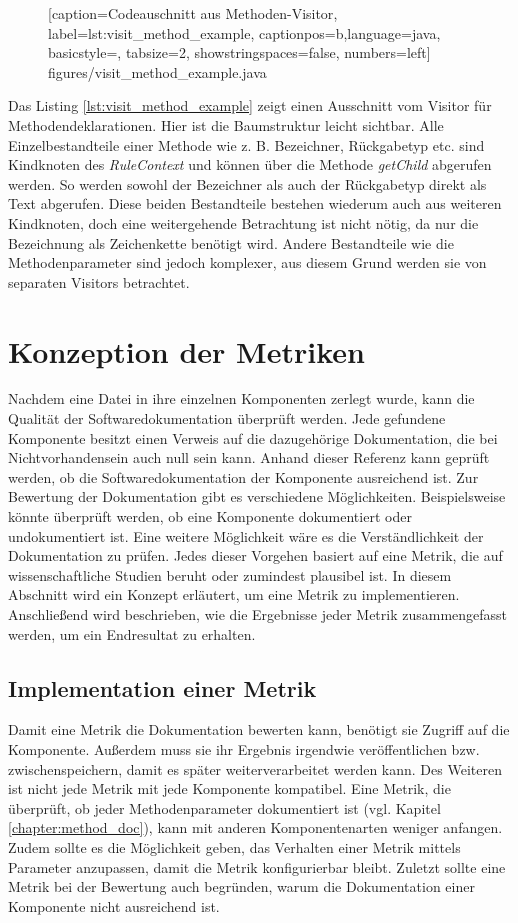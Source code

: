 		\begin{figure} [htbp]
			
			[caption={Codeauschnitt aus  Methoden-Visitor},
			label={lst:visit_method_example},
			captionpos=b,language=java, basicstyle=\footnotesize, tabsize=2, showstringspaces=false,  numbers=left]
			{figures/visit_method_example.java}
		\end{figure}
Das Listing \ref{lst:visit_method_example} zeigt einen Ausschnitt vom Visitor für Methodendeklarationen. Hier ist die Baumstruktur leicht sichtbar. Alle Einzelbestandteile einer Methode wie z. B. Bezeichner, Rückgabetyp etc. sind Kindknoten des \textit{RuleContext} und können über die Methode \textit{getChild} abgerufen werden. So werden sowohl der Bezeichner als auch der Rückgabetyp direkt als Text abgerufen. Diese  beiden Bestandteile bestehen wiederum auch aus weiteren Kindknoten, doch eine weitergehende Betrachtung ist nicht nötig, da nur die Bezeichnung als Zeichenkette benötigt wird. Andere Bestandteile wie die Methodenparameter sind jedoch komplexer, aus diesem Grund werden sie von separaten Visitors betrachtet.

\section{Konzeption der Metriken}
Nachdem eine Datei in ihre einzelnen Komponenten zerlegt wurde, kann die Qualität der Softwaredokumentation überprüft werden. Jede gefundene Komponente besitzt einen Verweis auf die dazugehörige Dokumentation, die bei Nichtvorhandensein auch null sein kann. Anhand dieser Referenz kann geprüft werden, ob die Softwaredokumentation der Komponente ausreichend ist. Zur Bewertung der Dokumentation gibt es verschiedene  Möglichkeiten. Beispielsweise könnte überprüft werden, ob eine Komponente dokumentiert oder undokumentiert ist. Eine weitere Möglichkeit wäre es die Verständlichkeit der Dokumentation zu prüfen. Jedes dieser Vorgehen basiert auf eine Metrik, die auf wissenschaftliche Studien beruht oder zumindest plausibel ist. In diesem Abschnitt wird ein Konzept erläutert, um eine Metrik zu implementieren. Anschließend wird beschrieben, wie die Ergebnisse jeder Metrik zusammengefasst werden, um ein Endresultat zu erhalten. 

\subsection{Implementation einer Metrik}
Damit eine Metrik die Dokumentation bewerten kann, benötigt sie Zugriff auf die Komponente. Außerdem muss sie ihr Ergebnis irgendwie veröffentlichen bzw. zwischenspeichern, damit es später weiterverarbeitet werden kann. Des Weiteren ist nicht jede Metrik mit jede Komponente kompatibel. Eine Metrik, die überprüft, ob jeder Methodenparameter dokumentiert ist (vgl. Kapitel \ref{chapter:method_doc}), kann mit anderen Komponentenarten weniger anfangen. Zudem sollte es die Möglichkeit geben, das Verhalten einer Metrik mittels Parameter anzupassen, damit die Metrik konfigurierbar bleibt. Zuletzt sollte eine Metrik bei der Bewertung auch begründen, warum die Dokumentation einer Komponente nicht ausreichend ist.

